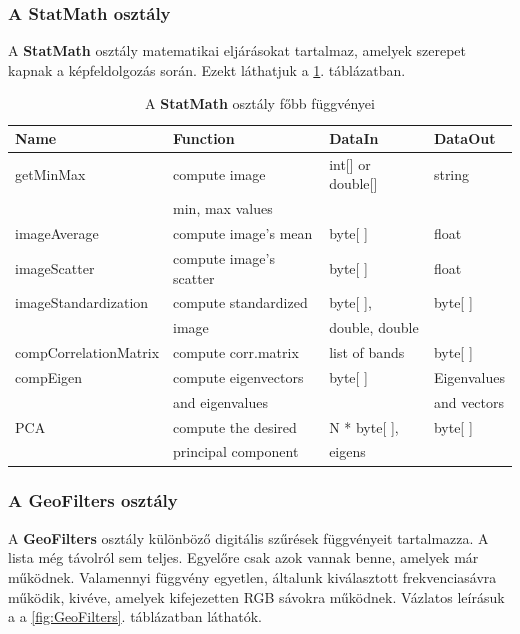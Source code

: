 \documentclass[a4paper,12pt]{article}
\begin{document}
\subsubsection{A \textbf{StatMath} osztály}

A \textbf{StatMath} osztály matematikai eljárásokat tartalmaz, amelyek szerepet kapnak a képfeldolgozás során. Ezekt láthatjuk a \ref{fig:StatMath}. táblázatban.

\begin{table}
	\begin{small}	
		\begin{tabular}{|l|l|l|l|}
			\hline
			\textbf{Name} & \textbf{Function} & \textbf{DataIn} & \textbf{DataOut}\\	
			\hline
			getMinMax&compute image & int[] or double[]&string\\
			&min, max values&&\\
			\hline
			imageAverage & compute image's mean& byte[ ]&float\\	
			\hline
			imageScatter & compute image's scatter& byte[ ]&float\\	
			\hline
			imageStandardization & compute standardized& byte[ ],  &byte[ ]\\	
			& image&double, double&\\
			\hline			
			compCorrelationMatrix&compute corr.matrix& list of bands& byte[ ]\\
			\hline
			compEigen & compute eigenvectors & byte[ ]&Eigenvalues\\
			&and eigenvalues & & and vectors\\
			\hline
			PCA & compute the desired& N * byte[ ], &byte[ ]\\
			&  principal component & eigens&\\

			\hline
		\end{tabular}
	\end{small}
	\caption{A \textbf{StatMath} osztály főbb függvényei}
	\label{fig:StatMath}
\end{table}


\subsubsection{A \textbf{GeoFilters} osztály}

A \textbf{GeoFilters} osztály különböző digitális szűrések függvényeit tartalmazza. A lista még távolról sem teljes. Egyelőre csak azok vannak benne, amelyek már működnek. Valamennyi függvény egyetlen, általunk kiválasztott frekvenciasávra működik, kivéve, amelyek kifejezetten RGB sávokra működnek. Vázlatos leírásuk a a \ref{fig:GeoFilters}. táblázatban láthatók.
\end{document}
